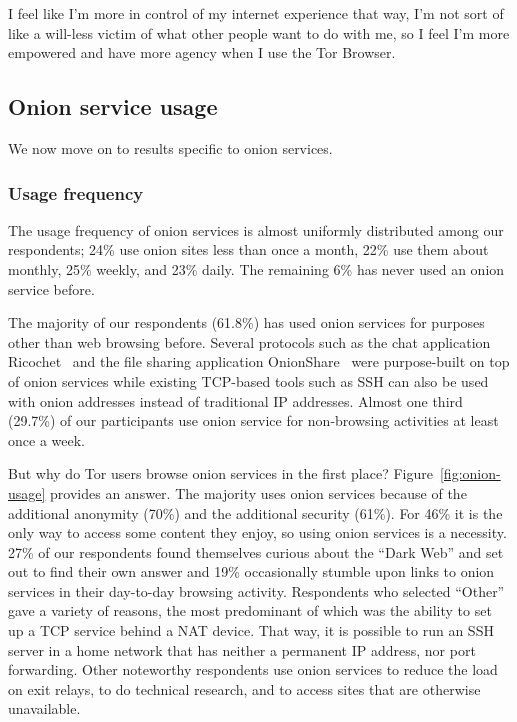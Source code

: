 \begin{displayquote}[P02]
I feel like I'm more in control of my internet experience that way, I'm not sort
of like a will-less victim of what other people want to do with me, so I feel
I'm more empowered and have more agency when I use the Tor Browser.
\end{displayquote}

\subsection{Onion service usage}

We now move on to results specific to onion services.

\subsubsection{Usage frequency}

The usage frequency of onion services is almost uniformly distributed among our
respondents; 24\% use onion sites less than once a month, 22\% use them about
monthly, 25\% weekly, and 23\% daily.  The remaining 6\% has never used an onion
service before.

The majority of our respondents (61.8\%) has used onion services for purposes
other than web browsing before.  Several protocols such as the chat application
Ricochet~\cite{ricochet} and the file sharing application
OnionShare~\cite{onionshare} were purpose-built on top of onion services while
existing TCP-based tools such as SSH can also be used with onion addresses
instead of traditional IP addresses.  Almost one third (29.7\%) of our
participants use onion service for non-browsing activities at least once a week.

But why do Tor users browse onion services in the first place?
Figure~\ref{fig:onion-usage} provides an answer.  The majority uses onion
services because of the additional anonymity (70\%) and the additional security
(61\%).  For 46\% it is the only way to access some content they enjoy, so using
onion services is a necessity.  27\% of our respondents found themselves curious
about the ``Dark Web'' and set out to find their own answer and 19\%
occasionally stumble upon links to onion services in their day-to-day browsing
activity.  Respondents who selected ``Other'' gave a variety of reasons, the
most predominant of which was the ability to set up a TCP service behind a NAT
device.  That way, it is possible to run an SSH server in a home network that
has neither a permanent IP address, nor port forwarding.  Other noteworthy
respondents use onion services to reduce the load on exit relays, to do
technical research, and to access sites that are otherwise unavailable.


